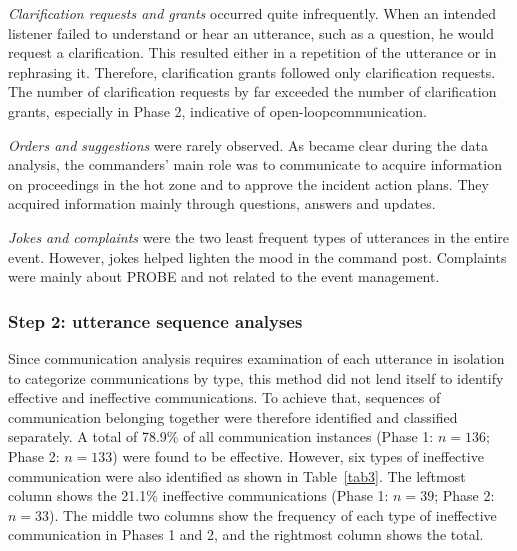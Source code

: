 \documentclass[link]{IWCOMP}
\begin{document}
\textit{Clarification requests and grants} occurred quite infrequently. When an intended listener failed to understand
or hear an utterance, such as a question, he would request a clarification.
This resulted either in a repetition of the utterance or in rephrasing it.
Therefore, clarification grants followed only clarification requests. The
number of clarification requests by far exceeded the number of clarification
grants, especially in Phase 2, indicative of open-loop\break communication.

\textit{Orders and suggestions} were rarely observed. As became clear during the data analysis, the
commanders' main role was to communicate to acquire information on
proceedings in the hot zone and to approve the incident action plans. They
acquired information mainly through questions, answers and updates.

\textit{Jokes and complaints} were the two least frequent types of utterances in the entire event.
However, jokes helped lighten the mood in the command post. Complaints were
mainly about PROBE and not related to the event management.

\subsubsection{Step 2: utterance sequence analyses}\label{subsubsec4.2.2}

Since communication analysis requires examination of each utterance in
isolation to categorize communications by type, this method did not lend
itself to identify effective and ineffective communications. To achieve
that, sequences of communication belonging together were therefore
identified and classified separately. A total of 78.9{\%} of all
communication instances (Phase 1: $n = 136$; Phase 2: $n = 133$) were found to
be effective. However, six types of ineffective communication were also
identified as shown in Table~\ref{tab3}. The leftmost column shows the 21.1{\%}
ineffective communications (Phase 1: $n = 39$; Phase 2: $n = 33$). The middle
two columns show the frequency of each type of ineffective communication in
Phases 1 and 2, and the rightmost column shows the total.
\end{document}
